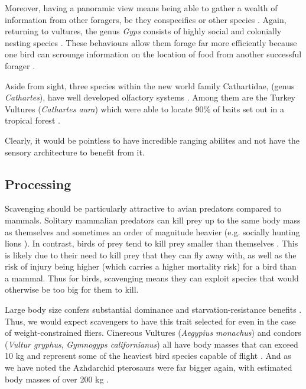 \documentclass[a4paper,12pt]{article}
\begin{document}
Moreover, having a panoramic view means being able to gather a wealth of information from other foragers, be they conspecifics or other species \citep{jackson2008effect}.
Again, returning to vultures, the genus \textit{Gyps} consists of highly social and colonially nesting species \citep{fernandez2015density}.
These behaviours allow them forage far more efficiently because one bird can scrounge information on the location of food from another successful forager \citep{KaneVul}.

Aside from sight, three species within the new world family Cathartidae, (genus \textit{Cathartes}), have well developed olfactory systems \citep{AR:AR22815}.
Among them are the Turkey Vultures (\textit{Cathartes aura}) which were able to locate 90\% of baits set out in a tropical forest \citep{houston1986olfaction}.

Clearly, it would be pointless to have incredible ranging abilites and not have the sensory architecture to benefit from it.


\subsection*{Processing}
Scavenging should be particularly attractive to avian predators compared to mammals.
Solitary mammalian predators can kill prey up to the same body mass as themselves and sometimes an order of magnitude heavier (e.g. socially hunting lions \citep{owen2008predator}).
In contrast, birds of prey tend to kill prey smaller than themselves \citep{slagsvold2007prey}.
This is likely due to their need to kill prey that they can fly away with, as well as the risk of injury being higher (which carries a higher mortality risk) for a bird than a mammal.
Thus for birds, scavenging means they can exploit species that would otherwise be too big for them to kill.

Large body size confers substantial dominance and starvation-resistance benefits \citep{ruxton2004obligate}.
Thus, we would expect scavengers to have this trait selected for even in the case of weight-constrained fliers.
Cinereous Vultures (\textit{Aegypius monachus}) and condors (\textit{Vultur gryphus}, \textit{Gymnogyps californianus}) all have body masses that can exceed 10 kg and represent some of the heaviest bird species capable of flight \citep{ferguson2001raptors,donazar2002effects}.
And as we have noted the Azhdarchid pterosaurs were far bigger again, with estimated body masses of over 200 kg \citep{witton2010size}.
\end{document}
